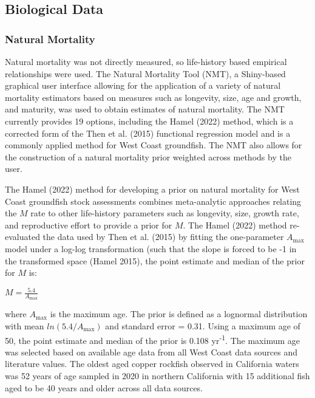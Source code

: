 \documentclass[11pt,
  english,
  letterpaper,
]{article}
\begin{document}
\hypertarget{biological-data}{%
\subsection{Biological Data}\label{biological-data}}

\hypertarget{natural-mortality}{%
\subsubsection{Natural Mortality}\label{natural-mortality}}

Natural mortality was not directly measured, so life-history based empirical relationships were used. The Natural Mortality Tool (NMT), a Shiny-based graphical user interface allowing for the application of a variety of natural mortality estimators based on measures such as longevity, size, age and growth, and maturity, was used to obtain estimates of natural mortality. The NMT currently provides 19 options, including the Hamel (2022) method, which is a corrected form of the Then et al. (2015) functional regression model and is a commonly applied method for West Coast groundfish. The NMT also allows for the construction of a natural mortality prior weighted across methods by the user.

The Hamel (2022) method for developing a prior on natural mortality for West Coast groundfish stock assessments combines meta-analytic approaches relating the \(M\) rate to other life-history parameters such as longevity, size, growth rate, and reproductive effort to provide a prior for \(M\). The Hamel (2022) method re-evaluated the data used by Then et al. (2015) by fitting the one-parameter \(A_{\text{max}}\) model under a log-log transformation (such that the slope is forced to be -1 in the transformed space (Hamel 2015), the point estimate and median of the prior for \(M\) is:

\begin{centering}

$M=\frac{5.4}{A_{\text{max}}}$

\end{centering}

\vspace{0.5cm}

where \(A_{\text{max}}\) is the maximum age. The prior is defined as a lognormal distribution with mean \(ln(5.4/A_{\text{max}})\) and standard error = 0.31. Using a maximum age of 50, the point estimate and median of the prior is 0.108 yr\textsuperscript{-1}. The maximum age was selected based on available age data from all West Coast data sources and literature values. The oldest aged copper rockfish observed in California waters was 52 years of age sampled in 2020 in northern California with 15 additional fish aged to be 40 years and older across all data sources.
\end{document}
